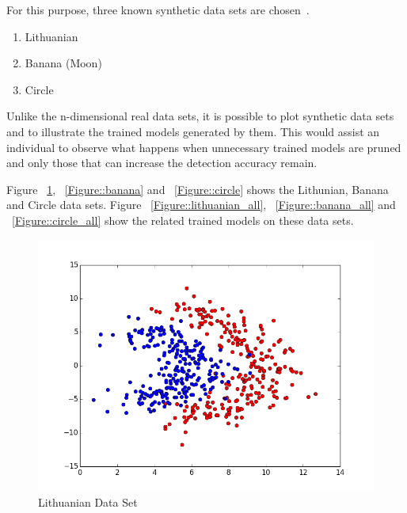 For this purpose, three known synthetic data sets are chosen~\cite{Duin2000}. 
\begin{enumerate}
  \item Lithuanian
  \item Banana (Moon)
  \item Circle
\end{enumerate}  

Unlike the n-dimensional real data sets, it is possible to plot synthetic data sets and to illustrate the trained models generated by them. This would assist an individual to observe what happens when unnecessary trained models are pruned and only those that can increase the detection accuracy remain.

Figure ~\ref{Figure::lithuanian}, ~\ref{Figure::banana} and ~\ref{Figure::circle} shows the Lithunian, Banana and Circle data sets. 
Figure ~\ref{Figure::lithuanian_all}, ~\ref{Figure::banana_all} and ~\ref{Figure::circle_all} show the related trained models on these data sets.

\begin{figure}[]
\centering
\includegraphics[scale=0.6]{figs/dataset_Lithuanian}
\caption{Lithuanian Data Set}
\label{Figure::lithuanian}
\end{figure}

